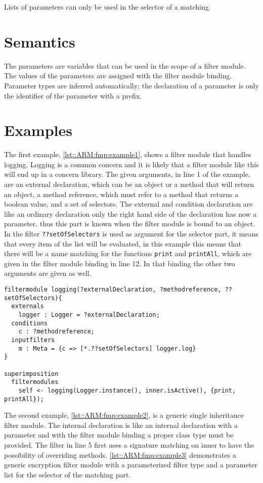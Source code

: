 Lists of parameters can only be used in the selector of a matching.

\section{Semantics}
The parameters are variables that can be used in the scope of a filter module. 
The values of the parameters are assigned with the filter module binding.
Parameter types are inferred automatically; the declaration of a parameter is only the identifier of the parameter with a prefix.

\section{Examples}
The first example, \autoref{lst::ARM:fmp:example1}, shows a filter module that handles logging. 
Logging is a common concern and it is likely that a filter module like this will end up in a concern library. 
The given arguments, in line 1 of the example, are an external declaration, which can be an object or a method that will return an object, a method reference, which must refer to a method that returns a boolean value, and a set of selectors.
The external and condition declaration are like an ordinary declaration only the right hand side of the declaration has now a parameter, thus this part is known when the filter module is bound to an object.
In the filter \lstinline!??setOfSelectors! is used as argument for the selector part, it means that every item of the list will be evaluated, in this example this means that there will be a name matching for the functions \lstinline!print! and \lstinline!printAll!, which are given in the filter module binding in line 12.
In that binding the other two arguments are given as well.

\begin{lstlisting}[caption={Example of a filter module for logging},label=lst::ARM:fmp:example1,
style=listing,language=ComposeStar,float=tpb]
filtermodule logging(?externalDeclaration, ?methodreference, ??setOfSelectors){
  externals
    logger : Logger = ?externalDeclaration;
  conditions
    c : ?methodreference;
  inputfilters
    m : Meta = {c => [*.??setOfSelectors] logger.log}
} 

superimposition
  filtermodules
    self <- logging(Logger.instance(), inner.isActive(), {print, printAll});
\end{lstlisting}

The second example, \autoref{lst::ARM:fmp:example2}, is a generic single inheritance filter module.
The internal declaration is like an internal declaration with a parameter and with the filter module binding a proper class type must be provided. 
The filter in line 5 first uses a signature matching on inner to have the possibility of overriding methods.
 \autoref{lst::ARM:fmp:example3} demonstrates a generic encryption filter module with a parameterized filter type and a parameter list for the selector of the matching part.

